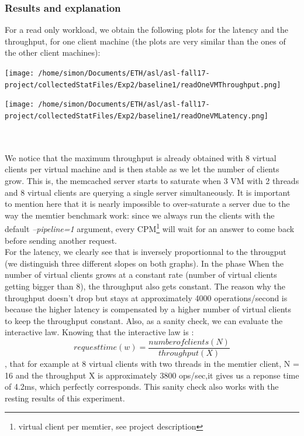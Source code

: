 \documentclass[11pt,a4paper]{article}
\begin{document}
\subsubsection{Results and explanation}
For a read only workload, we obtain the following plots for the latency and the throughput, for one client machine (the plots are very similar than the ones of the other client machines):
\\
\begin{minipage}{0.5\linewidth}
\texttt{[image: /home/simon/Documents/ETH/asl/asl-fall17-project/collectedStatFiles/Exp2/baseline1/readOneVMThroughput.png]}
\end{minipage}
\hfill
\begin{minipage}{0.5\linewidth}
\texttt{[image: /home/simon/Documents/ETH/asl/asl-fall17-project/collectedStatFiles/Exp2/baseline1/readOneVMLatency.png]}
\end{minipage}
\\\\
We notice that the maximum throughput is already obtained with 8 virtual clients per virtual machine and is then stable as we let the number of clients grow. This is, the memcached server starts to saturate when 3 VM with 2 threads and 8 virtual clients are querying a single server simultaneously. It is important to mention here that it is nearly impossible to over-saturate a server due to the way the memtier benchmark work: since we always run the clients with the default \textit{--pipeline=1} argument, every CPM\footnote{virtual client per memtier, see project description} will wait for an answer to come back before sending another request.
\\
For the latency, we clearly see that is inversely proportionnal to the througput (we distinguish three different slopes on both graphs). In the phase When the number of virtual clients grows at a constant rate (number of virtual clients getting bigger than 8), the throughput also gets constant. The reason why the throughput doesn't drop but stays at approximately 4000 operations/second is because the higher latency is compensated by a higher number of virtual clients to keep the throughput constant. Also, as a sanity check, we can evaluate the interactive law. Knowing that the interactive law is : \[ request time (w) = \frac{number of clients (N)}{throughput (X)}\], that for example at 8 virtual clients with two threads in the memtier client, N = 16 and the throughput X is approximately 3800 ops/sec,it gives us a reponse time of 4.2ms, which perfectly corresponds. This sanity check also works with the resting results of this experiment. 
\end{document}
